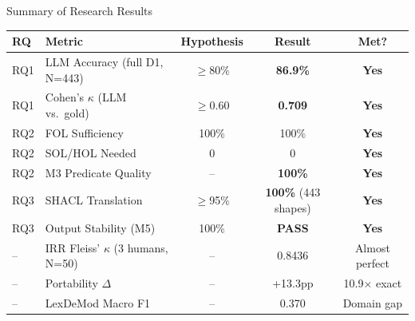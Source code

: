 \documentclass[aspectratio=169, 10pt]{beamer}
\begin{document}
\begin{frame}{Summary of Research Results}
    \begin{table}[]
        \centering
        \small
        \begin{tabular}{llccc}
            \toprule
            \textbf{RQ} & \textbf{Metric} & \textbf{Hypothesis} & \textbf{Result} & \textbf{Met?} \\
            \midrule
            RQ1 & LLM Accuracy (full D1, N=443) & $\geq$80\% & \textbf{86.9\%} & \textbf{Yes} \\
            RQ1 & Cohen's $\kappa$ (LLM vs.\ gold) & $\geq$0.60 & \textbf{0.709} & \textbf{Yes} \\
            RQ2 & FOL Sufficiency & 100\% & 100\% & \textbf{Yes} \\
            RQ2 & SOL/HOL Needed & 0 & 0 & \textbf{Yes} \\
            RQ2 & M3 Predicate Quality & -- & \textbf{100\%} & \textbf{Yes} \\
            RQ3 & SHACL Translation & $\geq$95\% & \textbf{100\%} (443 shapes) & \textbf{Yes} \\
            RQ3 & Output Stability (M5) & 100\% & \textbf{PASS} & \textbf{Yes} \\
            \midrule
            -- & IRR Fleiss' $\kappa$ (3 humans, N=50) & -- & 0.8436 & Almost perfect \\
            -- & Portability $\Delta$ & -- & +13.3pp & 10.9$\times$ exact \\
            -- & LexDeMod Macro F1 & -- & 0.370 & Domain gap \\
            \bottomrule
        \end{tabular}
    \end{table}
\end{frame}
\end{document}
